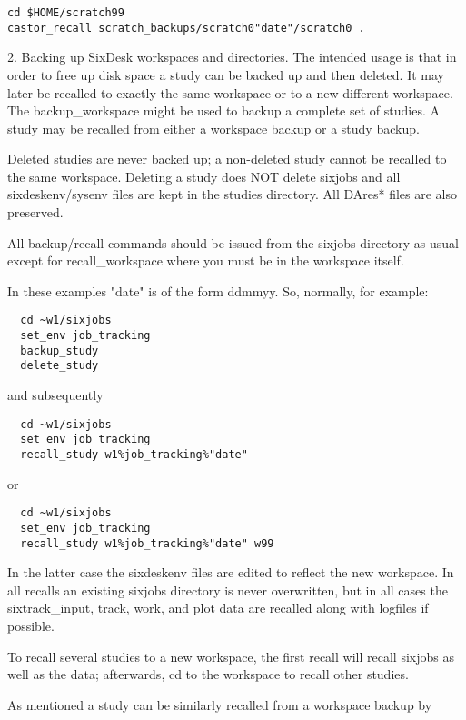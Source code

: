 \documentclass{cernatsnote}    %
\begin{document}
\begin{verbatim}
cd $HOME/scratch99
castor_recall scratch_backups/scratch0"date"/scratch0 .
\end{verbatim}

 2. Backing up SixDesk workspaces and directories.
 The intended usage is that in order to free up disk space a study can be 
backed up and then deleted. It may later be recalled to exactly the same
workspace or to a new different workspace. The backup\_workspace might be
used to backup a complete set of studies. A study may be recalled from 
either a workspace backup or a study backup.

 Deleted studies are never backed up; a non-deleted study cannot be recalled
to the same workspace. Deleting a study does NOT delete sixjobs and all
sixdeskenv/sysenv files are kept in the studies directory. All DAres* files
are also preserved.

 All backup/recall commands should be issued from the sixjobs directory as usual
except for recall\_workspace where you must be in the workspace itself.

 In these examples "date" is of the form ddmmyy.
 So, normally, for example:

\begin{verbatim}
  cd ~w1/sixjobs
  set_env job_tracking
  backup_study
  delete_study
\end{verbatim}

and subsequently

\begin{verbatim}
  cd ~w1/sixjobs
  set_env job_tracking
  recall_study w1%job_tracking%"date"
\end{verbatim}

or

\begin{verbatim}
  cd ~w1/sixjobs
  set_env job_tracking
  recall_study w1%job_tracking%"date" w99
\end{verbatim}
  
In the latter case the sixdeskenv files are edited to reflect the new
workspace. In all recalls an 
existing sixjobs directory is never overwritten, but in all cases the 
sixtrack\_input, track, work, and plot data are recalled along with 
logfiles if possible.

 To recall several studies to a new workspace, the first recall will
recall sixjobs as well as the data; afterwards, cd to the workspace
to recall other studies.

 As mentioned a study can be similarly recalled from a workspace backup by
\end{document}
